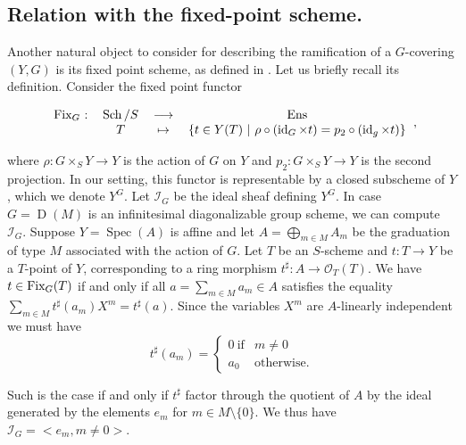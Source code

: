 \documentclass{amsart}
\theoremstyle{definition}
\theoremstyle{remark}
\begin{document}
\subsection{Relation with the fixed-point scheme.}
\label{comparaison}

Another natural object to consider for describing the ramification of a $G$-covering $(Y,G)$ is its fixed point scheme, as defined in \cite{Fogarty}. Let us briefly recall its definition. Consider the fixed point functor 

\[ \begin{tabular}{cccc}

$\textup{Fix}_G$ : & $\operatorname{Sch}/S$ & ${\longrightarrow}$ & $\operatorname{Ens}$ \\ 

& $T$ & $\mapsto$ & $\{ t \in Y(T) \ | \ \rho \circ(\operatorname{id}_G \times t) = p_2 \circ (\operatorname{id}_g \times t) \}$ \\ 

\end{tabular}, \]

where $\rho : G \times_S Y {\longrightarrow} Y$ is the action of $G$ on $Y$ and $p_2 : G \times_SY {\longrightarrow} Y$ is the second projection. 
In our setting, this functor is representable by a closed subscheme  of $Y$, which we denote $Y^G$. Let ${{\mathcal I}}_G$ be the ideal sheaf defining $Y^G$. In case $G = \operatorname{D}(M)$ is an infinitesimal diagonalizable group scheme, we can compute ${{\mathcal I}}_G$. Suppose $Y = \operatorname{Spec}(A)$ is affine and let $A = \displaystyle\bigoplus_{m \in M} A_m$ be the graduation of type $M$ associated with the action of $G$. Let $T$ be an $S$-scheme and $t : T {\longrightarrow} Y$ be a $T$-point of $Y$, corresponding to a ring morphism $t^\sharp : A {\longrightarrow} {{\mathcal O}}_T(T)$. We have $t \in \textup{Fix}_G(T)$ if and only if all $a = \displaystyle\sum_{m \in M} a_m \in A$ satisfies the equality $\displaystyle\sum_{m \in M} t^\sharp(a_m)X^m = t^\sharp(a)$. Since the variables $X^m$ are $A$-linearly independent we must have \[ t^\sharp(a_m) = \begin{cases} 0  \ \text{if} & m \neq 0  \\
a_0 \  & \text{otherwise}.
\end{cases} \]   

Such is the case if and only if $t^\sharp$ factor through the quotient of $A$ by the ideal generated by the elements $e_m$ for $m \in M \setminus \{0\}$. We thus have ${{\mathcal I}}_G = < e_m, m \neq 0 >$. 
\end{document}
